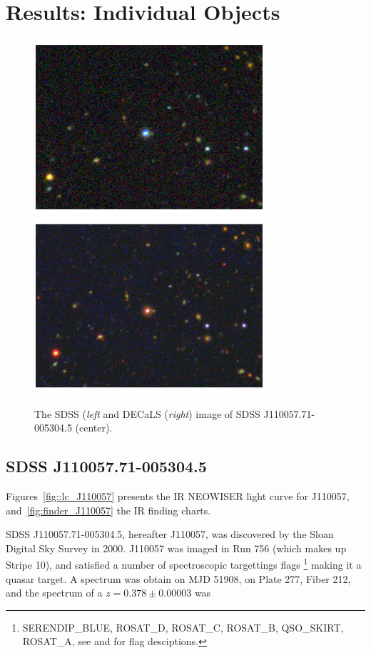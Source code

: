 \documentclass{emulateapj}
\begin{document}
\section{Results: Individual Objects}

\begin{figure}
  \includegraphics[width=8.50cm, height=6.50cm, trim=0.0cm 0.0cm 0.0cm 0.0cm, clip]
  {../images/J110057_sdss_image_nolabels.pdf}
  \includegraphics[width=8.50cm, height=6.50cm, trim=0.0cm 0.0cm 0.0cm 0.0cm, clip]
  {../images/J110057_decals_image_nolabels.pdf}
  \centering
  \caption[]{The SDSS ({\it left} and DECaLS ({\it right}) image of SDSS J110057.71-005304.5 (center). } 
\label{fig:w1100m0052_sdss}
\end{figure}


\subsection{SDSS J110057.71-005304.5}
Figures~\ref{fig::lc_J110057} presents the IR NEOWISER light curve for 
J110057, and~\ref{fig:finder_J110057} the IR finding charts. 


SDSS J110057.71-005304.5, hereafter J110057, was discovered by 
the Sloan Digital Sky Survey in 2000. 
 J110057 was imaged in Run 756 (which makes up Stripe 10), 
and satisfied a number of spectroscopic targettings flags
\footnote{SERENDIP\_BLUE, ROSAT\_D,  ROSAT\_C,  ROSAT\_B, QSO\_SKIRT, ROSAT\_A, 
see \citet{EDR} and \citet{Richards02} for flag desciptions.}
making it a quasar target. A spectrum was obtain on MJD 51908, on Plate 
277, Fiber 212, and the spectrum of a $z=0.378\pm0.00003$ was
\end{document}

